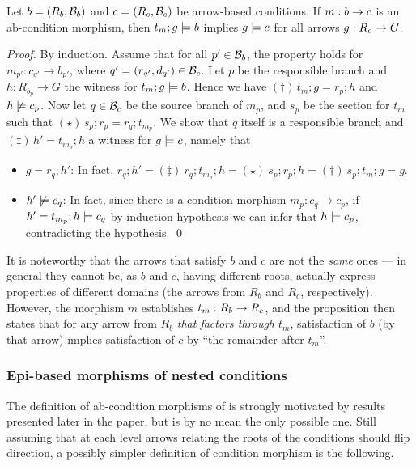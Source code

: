 \begin{proposition}
Let $b = (R_b, \mathcal{B}_b)$ and $c = (R_c, \mathcal{B}_c)$  be arrow-based conditions. If $m:b\rightarrow c$ is an ab-condition morphism, then $t_m;g\models b$ implies $g \models c$ for all arrows $g:R_c\rightarrow G$.
\end{proposition}
%
\emph{Proof.} By induction. Assume that for all $p'\in \mathcal{B}_b$, the property holds for $m_{p'}:c_{q'} \to b_{p'}$, where $q' = (r_{q'}, d_{q'}) \in \mathcal{B}_c$. Let $p$ be the responsible branch and $h: R_{b_{p}} \to G$ the witness for $t_m;g\models b$. 
Hence we have $(\dagger)\, t_m; g=r_{p};h$ and $h \not\models c_p$.  Now let $q \in \mathcal{B}_c$ be the source branch of $m_{p}$, and $s_p$ be the section for $t_m$ such that $(\star)\, s_p;r_p = r_q; t_{m_p}$. 
We show that $q$ itself is a responsible branch and $(\ddagger)\, h'=t_{m_p};h$ a witness for $g\models c$, namely that 
\begin{itemize}
\item $g = r_q;h'$: In fact, $r_q;h' =\!(\ddagger)\ r_q;t_{m_p};h =\!(\star)\ s_p;r_p; h  =\!(\dagger)\ s_p;t_m;g = g$. 
\item $h' \not\models c_q$: In fact, since there is a condition morphism $m_{p}: c_q \to c_p$, if $h'= t_{m_p};h \models c_q$ by induction hypothesis we can infer that $h \models c_p$, contradicting the hypothesis. \qed
\end{itemize}

It is noteworthy that the arrows that satisfy $b$ and $c$ are not the \emph{same} ones --- in general they cannot be, as $b$ and $c$, having different roots, actually express properties of different domains (the arrows from $R_b$ and $R_c$, respectively). However, the morphism $m$ establishes $t_m:R_b\rightarrow R_c$, and the proposition then states that for any arrow from $R_b$ \emph{that factors through $t_m$}, satisfaction of $b$ (by that arrow) implies satisfaction of $c$ by ``the remainder after $t_m$''.


\subsubsection{Epi-based morphisms of nested conditions}

The definition of ab-condition morphisms of  is strongly motivated by results presented later in the paper, but is by no mean the only possible one. Still assuming that at each level arrows relating the roots of the conditions should flip direction, a possibly simpler definition of condition morphism is the following.  

